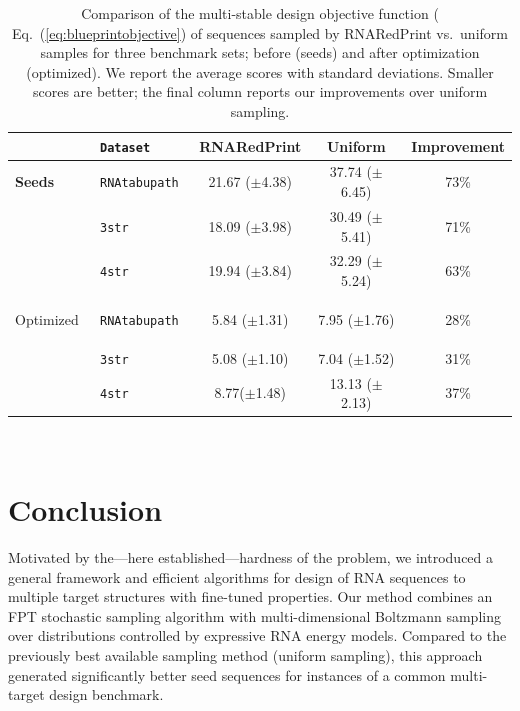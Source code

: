 \documentclass{bioinfo}
\newcommand{\Software}[1]{{\ttfamily #1}}
\newcommand{\ourprog}{\Software{RNARedPrint}}
\begin{document}
\begin{table}[t]
\centering
\medskip
\begin{tabular}{@{}>{\bf}l@{\quad}>{\tt}l@{\quad}@{\quad}c@{\quad}c@{\quad}c@{}}
             &   Dataset   & {\bfseries\ourprog{}} & \textbf{Uniform} & \textbf{Improvement} \\\toprule
  Seeds      & RNAtabupath & 21.67 ($\pm$4.38) & 37.74 ($\pm$6.45) & 73\%\\
             & 3str & 18.09 ($\pm$3.98) & 30.49 ($\pm$5.41) & 71\%\\
             & 4str & 19.94 ($\pm$3.84) & 32.29 ($\pm$5.24) & 63\%\\\midrule

  Optimized  & RNAtabupath & 5.84 ($\pm$1.31) & 7.95 ($\pm$1.76) & 28\%\\
             & 3str & 5.08 ($\pm$1.10) & 7.04 ($\pm$1.52) & 31\%\\
             & 4str & 8.77($\pm$1.48) & 13.13 ($\pm$2.13) & 37\% \\ \bottomrule
\end{tabular}\\[1em]

\caption{Comparison of the multi-stable design objective function (
  Eq.~(\ref{eq:blueprintobjective}) of sequences sampled by \ourprog{}
  vs.\ uniform samples for three benchmark sets; before (seeds) and
  after optimization (optimized). We report the average scores with
  standard deviations. Smaller scores are better; the final column
  reports our improvements over uniform sampling.}
\label{tab:benchmark-results}

\vspace{-12pt}
\end{table}

\section{Conclusion}
Motivated by the---here established---hardness of the problem, we introduced a general framework and efficient algorithms for design of RNA sequences to multiple target structures with fine-tuned properties. Our method combines an FPT stochastic sampling algorithm with multi-dimensional Boltzmann sampling over distributions controlled by expressive RNA energy models.
Compared to the previously best available sampling method (uniform sampling), this approach generated significantly better seed sequences for instances of a common multi-target design benchmark.
\end{document}
